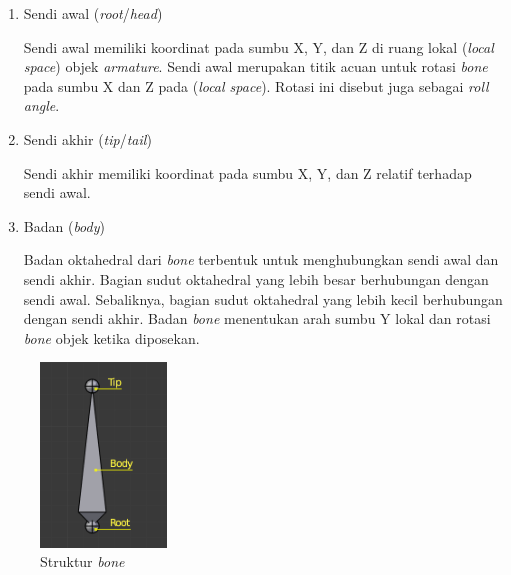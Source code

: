 \begin{enumerate}
    \item Sendi awal (\textit{root}/\textit{head})

    Sendi awal memiliki koordinat pada sumbu X, Y, dan Z di ruang lokal
    (\textit{local space}) objek \textit{armature}. Sendi awal merupakan titik
    acuan untuk rotasi \textit{bone} pada sumbu X dan Z pada (\textit{local
    space}). Rotasi ini disebut juga sebagai \textit{roll angle}.

    \item Sendi akhir (\textit{tip}/\textit{tail})

    Sendi akhir memiliki koordinat pada sumbu X, Y, dan Z relatif terhadap sendi
    awal.

    \item Badan (\textit{body})

    Badan oktahedral dari \textit{bone} terbentuk untuk menghubungkan sendi awal
    dan sendi akhir. Bagian sudut oktahedral yang lebih besar berhubungan
    dengan sendi awal. Sebaliknya, bagian sudut oktahedral yang lebih kecil
    berhubungan dengan sendi akhir. Badan \textit{bone} menentukan arah sumbu Y
    lokal dan rotasi \textit{bone} objek ketika diposekan.

\end{enumerate}

\begin{figure}[ht]
    \centering
    \includegraphics[width=0.3\textwidth]{resources/chapter-2-bone-structure.png}
    \caption{Struktur \textit{bone} \parencite{blender-bones-structure}}
    \label{fig:bone-structure}
\end{figure}


